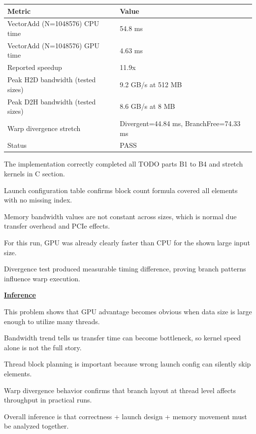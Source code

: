 \documentclass[12pt]{article}
\begin{document}
\begin{center}
\begin{tabular}{|p{7cm}|p{5cm}|}
\hline
\textbf{Metric} & \textbf{Value} \\
\hline
VectorAdd (N=1048576) CPU time & 54.8 ms \\
\hline
VectorAdd (N=1048576) GPU time & 4.63 ms \\
\hline
Reported speedup & 11.9x \\
\hline
Peak H2D bandwidth (tested sizes) & 9.2 GB/s at 512 MB \\
\hline
Peak D2H bandwidth (tested sizes) & 8.6 GB/s at 8 MB \\
\hline
Warp divergence stretch & Divergent=44.84 ms, BranchFree=74.33 ms \\
\hline
Status & PASS \\
\hline
\end{tabular}
\end{center}

The implementation correctly completed all TODO parts B1 to B4 and stretch kernels in C section.

Launch configuration table confirms block count formula covered all elements with no missing index.

Memory bandwidth values are not constant across sizes, which is normal due transfer overhead and PCIe effects.

For this run, GPU was already clearly faster than CPU for the shown large input size.

Divergence test produced measurable timing difference, proving branch patterns influence warp execution.

\vspace{0.8cm}

\textbf{\Large \underline{Inference}}

\vspace{0.5cm}

This problem shows that GPU advantage becomes obvious when data size is large enough to utilize many threads.

Bandwidth trend tells us transfer time can become bottleneck, so kernel speed alone is not the full story.

Thread block planning is important because wrong launch config can silently skip elements.

Warp divergence behavior confirms that branch layout at thread level affects throughput in practical runs.

Overall inference is that correctness + launch design + memory movement must be analyzed together.
\end{document}

